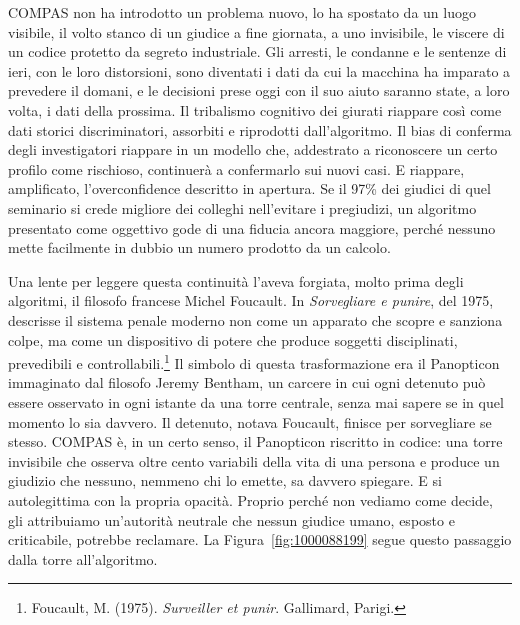 COMPAS non ha introdotto un problema nuovo, lo ha spostato da un luogo visibile, il volto stanco di un giudice a fine giornata, a uno invisibile, le viscere di un codice protetto da segreto industriale. Gli arresti, le condanne e le sentenze di ieri, con le loro distorsioni, sono diventati i dati da cui la macchina ha imparato a prevedere il domani, e le decisioni prese oggi con il suo aiuto saranno state, a loro volta, i dati della prossima. Il tribalismo cognitivo dei giurati riappare cos\`{i} come dati storici discriminatori, assorbiti e riprodotti dall'algoritmo. Il bias di conferma degli investigatori riappare in un modello che, addestrato a riconoscere un certo profilo come rischioso, continuer\`{a} a confermarlo sui nuovi casi. E riappare, amplificato, l'overconfidence descritto in apertura. Se il 97\% dei giudici di quel seminario si crede migliore dei colleghi nell'evitare i pregiudizi, un algoritmo presentato come oggettivo gode di una fiducia ancora maggiore, perch\'{e} nessuno mette facilmente in dubbio un numero prodotto da un calcolo.

Una lente per leggere questa continuit\`{a} l'aveva forgiata, molto prima degli algoritmi, il filosofo francese Michel Foucault. In \textit{Sorvegliare e punire}, del 1975, descrisse il sistema penale moderno non come un apparato che scopre e sanziona colpe, ma come un dispositivo di potere che produce soggetti disciplinati, prevedibili e controllabili.\footnote{Foucault, M. (1975). \textit{Surveiller et punir}. Gallimard, Parigi.} Il simbolo di questa trasformazione era il Panopticon immaginato dal filosofo Jeremy Bentham, un carcere in cui ogni detenuto pu\`{o} essere osservato in ogni istante da una torre centrale, senza mai sapere se in quel momento lo sia davvero. Il detenuto, notava Foucault, finisce per sorvegliare se stesso. COMPAS \`{e}, in un certo senso, il Panopticon riscritto in codice: una torre invisibile che osserva oltre cento variabili della vita di una persona e produce un giudizio che nessuno, nemmeno chi lo emette, sa davvero spiegare. E si autolegittima con la propria opacit\`{a}. Proprio perch\'{e} non vediamo come decide, gli attribuiamo un'autorit\`{a} neutrale che nessun giudice umano, esposto e criticabile, potrebbe reclamare. La Figura~\ref{fig:1000088199} segue questo passaggio dalla torre all'algoritmo.


